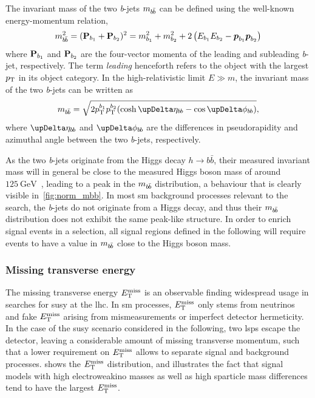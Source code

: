 The invariant mass of the two \textit{b}-jets $m_{b\hspace{-0.06em}\bar{b}}$ can be defined using the well-known energy-momentum relation, 
\begin{equation}
	\mbb^2 = (\makemebold{\mathrm{P}}_{b_1}+\makemebold{\mathrm{P}}_{b_2})^2 = m^2_{b_1} + m^2_{b_2} + 2\left(E_{b_1}E_{b_2} - \makemebold{p}_{b_1}\makemebold{p}_{b_2}\right)
\end{equation}
where $\makemebold{\mathrm{P}}_{b_1}$ and $\makemebold{\mathrm{P}}_{b_2}$ are the four-vector momenta of the leading and subleading \textit{b}-jet, respectively. The term \textit{leading} henceforth refers to the object with the largest $p_{\mathrm{T}}$ in its object category. In the high-relativistic limit $E \gg m$, the invariant mass of the two \textit{b}-jets can be written as
\begin{equation}
	\mbb = \sqrt{2\pt^{b_1}\pt^{b_2}(\cosh\upDelta\eta_{b\hspace{-0.06em}b} - \cos\upDelta\phi_{b\hspace{-0.06em}b})},
\end{equation}
where $\upDelta\eta_{b\hspace{-0.06em}b}$ and $\upDelta\phi_{b\hspace{-0.06em}b}$ are the differences in pseudorapidity and azimuthal angle between the two \textit{b}-jets, respectively.

As the two \textit{b}-jets originate from the Higgs decay $h\rightarrow b\bar{b}$, their measured invariant mass will in general be close to the measured Higgs boson mass of around $\SI{125}{\GeV}$~\cite{pdg2020}, leading to a peak in the $m_{b\hspace{-0.06em}\bar{b}}$ distribution, a behaviour that is clearly visible in~\cref{fig:norm_mbb}. In most \gls{sm} background processes relevant to the search, the \textit{b}-jets do not originate from a Higgs decay, and thus their $m_{b\hspace{-0.06em}\bar{b}}$ distribution does not exhibit the same peak-like structure. In order to enrich signal events in a selection, all signal regions defined in the following will require events to have a value in $m_{b\hspace{-0.06em}\bar{b}}$ close to the Higgs boson mass.

\subsubsection{Missing transverse energy}

The missing transverse energy $E_{\textrm{T}}^{\textrm{miss}}$ is an observable finding widespread usage in searches for \gls{susy} at the \gls{lhc}. In \gls{sm} processes, $E_{\textrm{T}}^{\textrm{miss}}$ only stems from neutrinos and fake $E_{\textrm{T}}^{\textrm{miss}}$ arising \eg from mismeasurements or imperfect detector hermeticity. In the case of the \gls{susy} scenario considered in the following, two \glspl{lsp} escape the detector, leaving a considerable amount of missing transverse momentum, such that a lower requirement on $E_{\textrm{T}}^{\textrm{miss}}$ allows to separate signal and background processes.  shows the $E_{\textrm{T}}^{\textrm{miss}}$ distribution, and illustrates the fact that signal models with high electroweakino masses as well as high sparticle mass differences tend to have the largest $E_{\textrm{T}}^{\textrm{miss}}$.  


